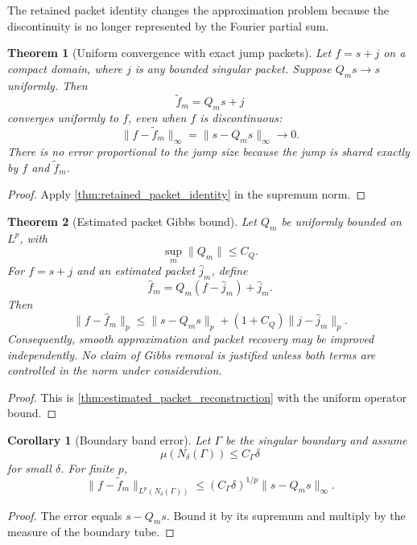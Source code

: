 \documentclass{aomart}
\newtheorem{theorem}{Theorem}[section]
\newtheorem{corollary}[corollary]{Corollary}
\theoremstyle{definition}
\theoremstyle{remark}
\begin{document}
The retained packet identity changes the approximation problem because the discontinuity is no longer represented by the Fourier partial sum.

\begin{theorem}[Uniform convergence with exact jump packets]\label{thm:uniform_packet_convergence}
Let \(f=s+j\) on a compact domain, where \(j\) is any bounded singular packet. Suppose \(Q_ms\to s\) uniformly. Then
\[
\widetilde f_m=Q_ms+j
\]
converges uniformly to \(f\), even when \(f\) is discontinuous:
\[
\|f-\widetilde f_m\|_\infty
=
\|s-Q_ms\|_\infty
\longrightarrow0.
\]
There is no error proportional to the jump size because the jump is shared exactly by \(f\) and \(\widetilde f_m\).
\end{theorem}

\begin{proof}
Apply \cref{thm:retained_packet_identity} in the supremum norm.
\end{proof}

\begin{theorem}[Estimated packet Gibbs bound]\label{thm:estimated_packet_gibbs}
Let \(Q_m\) be uniformly bounded on \(L^p\), with
\[
\sup_m\|Q_m\|\leq C_Q.
\]
For \(f=s+j\) and an estimated packet \(\widehat j_m\), define
\[
\widehat f_m
=Q_m(f-\widehat j_m)+\widehat j_m.
\]
Then
\[
\|f-\widehat f_m\|_p
\leq
\|s-Q_ms\|_p
+(1+C_Q)\|j-\widehat j_m\|_p.
\]
Consequently, smooth approximation and packet recovery may be improved independently. No claim of Gibbs removal is justified unless both terms are controlled in the norm under consideration.
\end{theorem}

\begin{proof}
This is \cref{thm:estimated_packet_reconstruction} with the uniform operator bound.
\end{proof}

\begin{corollary}[Boundary band error]\label{cor:boundary_band_error}
Let \(\Gamma\) be the singular boundary and assume
\[
\mu(N_\delta(\Gamma))\leq C_\Gamma\delta
\]
for small \(\delta\). For finite \(p\),
\[
\|f-\widetilde f_m\|_{L^p(N_\delta(\Gamma))}
\leq
(C_\Gamma\delta)^{1/p}
\|s-Q_ms\|_\infty.
\]
\end{corollary}

\begin{proof}
The error equals \(s-Q_ms\). Bound it by its supremum and multiply by the measure of the boundary tube.
\end{proof}
\end{document}
